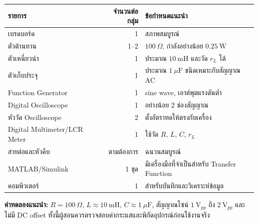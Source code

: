 \begin{table}[htbp]
    \centering
    \begin{tabular}{l r l}
        \hline
        \textbf{รายการ} & \textbf{จำนวนต่อกลุ่ม} & \textbf{ข้อกำหนดแนะนำ} \\
        \hline
        เบรดบอร์ด & 1 & สภาพสมบูรณ์ \\
        ตัวต้านทาน & 1–2 & $100\ \Omega$, กำลังอย่างน้อย $0.25\ \text{W}$ \\
        ตัวเหนี่ยวนำ & 1 & ประมาณ $10\ \text{mH}$ และวัด $r_L$ ได้ \\
        ตัวเก็บประจุ & 1 & ประมาณ $1\ \mu\text{F}$ ชนิดเหมาะกับสัญญาณ AC \\
        Function Generator & 1 & sine wave, เอาต์พุตแรงดันต่ำ \\
        Digital Oscilloscope & 1 & อย่างน้อย 2 ช่องสัญญาณ \\
        หัววัด Oscilloscope & 2 & ตั้งอัตราทดให้ตรงกับเครื่อง \\
        Digital Multimeter/LCR Meter & 1 & ใช้วัด $R$, $L$, $C$, $r_L$ \\
        สายต่อและหัวคีบ & ตามต้องการ & ฉนวนสมบูรณ์ \\
        MATLAB/Simulink & 1 ชุด & มีเครื่องมือที่จำเป็นสำหรับ Transfer Function \\
        คอมพิวเตอร์ & 1 & สำหรับบันทึกและวิเคราะห์ข้อมูล \\
        \hline
    \end{tabular}
\end{table}

\textbf{ค่าทดลองแนะนำ:} $R=100\ \Omega$, $L\approx10\ \text{mH}$, $C\approx1\ \mu\text{F}$, สัญญาณไซน์ $1\ \text{V}_{pp}$ ถึง $2\ \text{V}_{pp}$ และไม่มี DC offset ทั้งนี้ผู้สอนควรตรวจสอบค่ากระแสและพิกัดอุปกรณ์ก่อนใช้งานจริง



